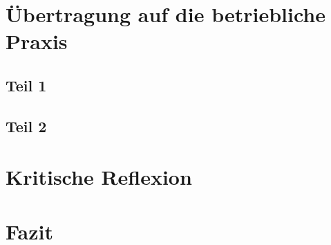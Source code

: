 \blindtext

\section{Übertragung auf die betriebliche Praxis}
\label{sec:Praxis}
\blindtext

\subsection{Teil 1}
\label{subsec:Teil1}
\blindtext

\subsection{Teil 2}
\label{subsec:Teil2}
\blindtext

\section{Kritische Reflexion}
\label{sec:Kritik}
\blindtext

\section{Fazit}
\label{sec:Fazit}
\blindtext

\clearpage
\setcounter{page}{ \value{myPageRomanCounter} }